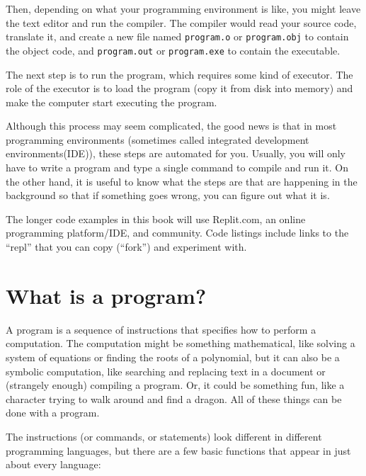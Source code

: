 Then, depending on what your programming environment is like,
you might leave the text editor and run the compiler.  The compiler would read your source code, translate it, and create
a new file named {\tt program.o} or {\tt program.obj} to contain the object code,
and {\tt program.out} or {\tt program.exe} to contain the executable. 

\vspace{0.1in}
\centerline{}
\vspace{0.1in}

The next step is to run the program, which requires some kind
of executor.  The role of the executor is to load the program
(copy it from disk into memory) and make the computer start
executing the program.

Although this process may seem complicated, the good news is that in
most programming environments (sometimes called integrated development
environments(IDE)), these steps are automated for you.  Usually, you will only have to write a program and type a single command to compile and
run it.  On the other hand, it is useful to know what the steps are
that are happening in the background so that if something goes wrong,
you can figure out what it is.

The longer code examples in this book will use Replit.com, an online programming
platform/IDE, and community. Code listings include links to the “repl” that you can copy 
(“fork”) and experiment with.

\section{What is a program?}

A program is a sequence of instructions that specifies how to perform
a computation.  The computation might be something mathematical, like
solving a system of equations or finding the roots of a polynomial,
but it can also be a symbolic computation, like searching and
replacing text in a document or (strangely enough) compiling a
program. Or, it could be something fun, like a character trying to walk around and find a dragon. All of these things can be done with a program.


The instructions (or commands, or statements) look different in
different programming languages, but there are a few basic functions
that appear in just about every language:

